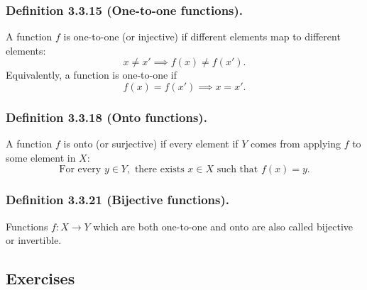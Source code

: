 \documentclass[12pt, letter]{article}
\begin{document}
\subsubsection*{Definition 3.3.15 (One-to-one functions).}
A function $f$ is one-to-one (or injective) if different elements map to different elements:
\begin{equation*}
    x\ne x'\implies f(x)\ne f(x').
\end{equation*}
Equivalently, a function is one-to-one if 
\begin{equation*}
    f(x)=f(x')\implies x=x'.
\end{equation*}
\subsubsection*{Definition 3.3.18 (Onto functions).}
A function $f$ is onto (or surjective) if every element if $Y$ comes from applying $f$ to some element in $X$:
\begin{equation*}
    \text{For every }y\in Y,\text{ there exists }x\in X \text{ such that }f(x)=y.
\end{equation*}
\subsubsection*{Definition 3.3.21 (Bijective functions).}
Functions $f:X\to Y$ which are both one-to-one and onto are also called bijective or invertible.


\subsection*{Exercises}
\end{document}
